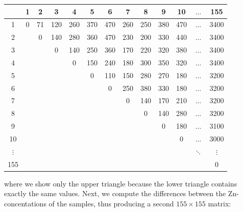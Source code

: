 \begin{center}
\begin{tabular}{c|cccccccccccc}
~  &  1 & 2 & 3 &  4  &  5  &  6  &  7  &  8  &  9 &  10 & $\ldots$ & 155 \\ \hline
1  &  0 &71 & 120 & 260 & 370 & 470 & 260 & 250 & 380 & 470 & $\ldots$ &3400 \\
2  &  ~ & 0 &140& 280 & 360 & 470 & 230 & 200 & 330 & 440 & $\ldots$ &3400 \\
3  &  ~ & ~ & 0 & 140 & 250 & 360 & 170 & 220 & 320 & 380 & $\ldots$ &3400 \\
4  &  ~ & ~ & ~ &  0  & 150 & 240 & 180 & 300 & 350 & 320 & $\ldots$ &3400 \\
5  &  ~ & ~ & ~ & ~   &  0  & 110 & 150 & 280 & 270 & 180 & $\ldots$ &3200 \\
6  &  ~ & ~ & ~ & ~   & ~   &  0 & 250 & 380 & 330 & 180 & $\ldots$ &3200 \\
7  &  ~ & ~ & ~ & ~   & ~   & ~  &  0 & 140 & 170 & 210 & $\ldots$ &3200 \\
8  &  ~ & ~ & ~ & ~   & ~   & ~  & ~  &  0  & 140 & 280 & $\ldots$ &3200 \\
9  &  ~ & ~ & ~ & ~   & ~   & ~  & ~  & ~   &  0  & 180 & $\ldots$ &3100 \\
10 &  ~ & ~ & ~ & ~   & ~   & ~  & ~  & ~   & ~   & 0   & $\ldots$ &3000 \\
$\vdots$ & ~   & ~ & ~ & ~ & ~ & ~ & ~ &
~ & ~   & ~ & $\ddots$ & $\vdots$ \\
155 & ~ & ~ & ~ & ~   & ~ & ~ & ~ & ~ & ~ & ~ & ~ & 0
\end{tabular}
\end{center}

\noindent where we show only the upper triangle because the lower
triangle contains exactly the same values. Next, we compute the
differences between the Zn-concentations of the samples, thus
producing a second $155\times{155}$ matrix:

